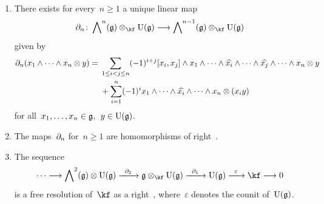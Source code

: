 \begin{corollary}
  \label{right koszul is a free resolution}
  \leavevmode
  \begin{enumerate}
    \item
      There exists for every~$n \geq 1$ a unique linear map
      \[
        \del_n
        \colon
        \Exterior^n(\glie) \otimes_{\kf} \Univ(\glie)
        \to
        \Exterior^{n-1}(\glie) \otimes_{\kf} \Univ(\glie)
      \]
      given by
      \begin{align*}
        \partial_n( x_1 \wedge \dotsb \wedge x_n \otimes y )
        ={}&
        \sum_{1 \leq i < j \leq n}
        (-1)^{i+j}
        [x_i, x_j] \wedge x_1 \wedge \dotsb \wedge \widehat{x_i} \wedge \dotsb \wedge \widehat{x_j} \wedge \dotsb \wedge x_n
        \otimes y
        \\
        {}&
        +
        \sum_{i=1}^n
        (-1)^i
        x_1 \wedge \dotsb \wedge \widehat{x_i} \wedge \dotsb \wedge x_n \otimes (x_i y)
      \end{align*}
      for all~$x_1, \dotsc, x_n \in \mathfrak{g}$,~$y \in \operatorname{U}(\mathfrak{g})$.
    \item
      The maps~$\partial_n$ for~$n \geq 1$ are homomorphisms of right~\modules{$\Univ(\glie)$}.
    \item
      The sequence
      \[
        \dotsb
        \to
        \Exterior^2(\glie) \otimes \Univ(\glie)
        \xto{\del_2}
        \glie \otimes_{\kf} \Univ(\glie)
        \xto{\del_1}
        \Univ(\glie)
        \xto{\varepsilon}
        \kf
        \to
        0
      \]
      is a free resolution of~$\kf$ as a right~\module{$\Univ(\glie)$}, where~$\varepsilon$ denotes the counit of~$\Univ(\glie)$.
  \end{enumerate}
\end{corollary}


